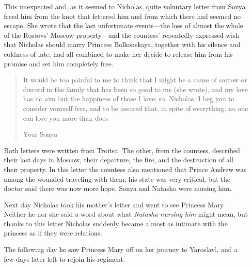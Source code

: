 This unexpected and, as it seemed to Nicholas, quite voluntary
letter from Sonya freed him from the knot that fettered him and
from which there had seemed no escape. She wrote that the last
unfortunate events---the loss of almost the whole of the Rostovs'
Moscow property---and the countess' repeatedly expressed wish
that Nicholas should marry Princess Bolkonskaya, together with
his silence and coldness of late, had all combined to make her
decide to release him from his promise and set him completely
free.  

\begin{quote} \calli 
It would be too painful to me to
think that I might be a cause of sorrow or discord in the family
that has been so good to me (she wrote), and my love has no aim
but the happiness of those I love; so, Nicholas, I beg you to
consider yourself free, and to be assured that, in spite of
everything, no one can love you more than does

  Your Sonya 
\end{quote} 
  
  Both letters were written from
Troitsa. The other, from the countess, described their last days
in Moscow, their departure, the fire, and the destruction of all
their property. In this letter the countess also mentioned that
Prince Andrew was among the wounded traveling with them; his
state was very critical, but the doctor said there was now more
hope. Sonya and Natasha were nursing him.

Next day Nicholas took his mother's letter and went to see
Princess Mary. Neither he nor she said a word about what
\emph{Natasha nursing him} might mean, but thanks to this letter
Nicholas suddenly became almost as intimate with the princess as
if they were relations.

The following day he saw Princess Mary off on her journey to
Yaroslavl, and a few days later left to rejoin his regiment.


